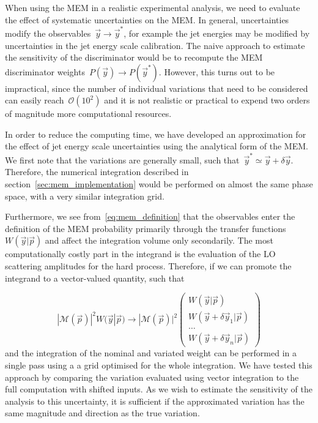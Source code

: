 When using the MEM in a realistic experimental analysis, we need to evaluate the effect of systematic uncertainties on the MEM. In general, uncertainties modify the observables~$\vec{y} \rightarrow \vec{y}^*$, for example the jet energies may be modified by uncertainties in the jet energy scale calibration. The naive approach to estimate the sensitivity of the discriminator would be to recompute the MEM discriminator weights~$P(\vec{y}) \rightarrow P(\vec{y}^*)$. However, this turns out to be impractical, since the number of individual variations that need to be considered can easily reach~$\mathcal{O}(10^2)$ and it is not realistic or practical to expend two orders of magnitude more computational resources.

In order to reduce the computing time, we have developed an approximation for the effect of jet energy scale uncertainties using the analytical form of the MEM. We first note that the variations are generally small, such that~$\vec{y}^* \simeq \vec{y} + \delta \vec{y}$. Therefore, the numerical integration described in section~\cref{sec:mem_implementation} would be performed on almost the same phase space, with a very similar integration grid.

Furthermore, we see from~\cref{eq:mem_definition} that the observables enter the definition of the MEM probability primarily through the transfer functions~$W(\vec{y} | \vec{p})$ and affect the integration volume only secondarily. The most computationally costly part in the integrand is the evaluation of the LO scattering amplitudes for the hard process. Therefore, if we can promote the integrand to a vector-valued quantity, such that

\begin{equation}
|\mathcal{M}(\vec{p})|^2 W(\vec{y} | \vec{p}) \rightarrow |\mathcal{M}(\vec{p})|^2  \begin{pmatrix}
  W(\vec{y} | \vec{p}) \\
  W(\vec{y} + \delta \vec{y}_1 | \vec{p}) \\
  \dots \\
  W(\vec{y} + \delta \vec{y}_n | \vec{p})
 \end{pmatrix}
\end{equation}
and the integration of the nominal and variated weight can be performed in a single pass using a a grid optimised for the whole integration. We have tested this approach by comparing the variation evaluated using vector integration to the full computation with shifted inputs. As we wish to estimate the sensitivity of the analysis to this uncertainty, it is sufficient if the approximated variation has the same magnitude and direction as the true variation.

